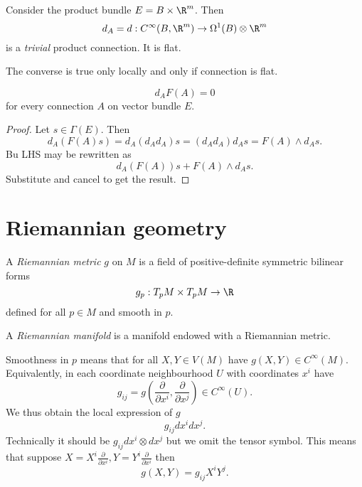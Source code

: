 \documentclass[a4paper]{article}
\newcommand{\w}{\wedge}
\begin{document}
\begin{eg}
  Consider the product bundle \(E = B \times \R^m\). Then
  \[
    d_A = d: C^\infty(B, \R^m) \to \Omega^1(B) \otimes \R^m
  \]
  is a \emph{trivial} product connection. It is flat.

  The converse is true only locally and only if connection is flat.
\end{eg}

\begin{theorem}
  \[
    d_AF(A) = 0
  \]
  for every connection \(A\) on vector bundle \(E\).
\end{theorem}

\begin{proof}
  Let \(s \in \Gamma(E)\). Then
  \[
    d_A(F(A)s) = d_A(d_Ad_A)s = (d_Ad_A)d_As = F(A) \w d_As.
  \]
  Bu LHS may be rewritten as
  \[
    d_A(F(A))s + F(A) \w d_As.
  \]
  Substitute and cancel to get the result.
\end{proof}

\section{Riemannian geometry}

\begin{definition}
  A \emph{Riemannian metric} \(g\) on \(M\) is a field of positive-definite symmetric bilinear forms
  \[
    g_p : T_pM \times T_pM \to \R
  \]
  defined for all \(p \in M\) and smooth in \(p\).
\end{definition}

\begin{definition}
  A \emph{Riemannian manifold} is a manifold endowed with a Riemannian metric.
\end{definition}

\begin{remark}
  Smoothness in \(p\) means that for all \(X, Y \in V(M)\) have \(g(X, Y) \in C^\infty(M)\). Equivalently, in each coordinate neighbourhood \(U\) with coordinates \(x^i\) have
  \[
    g_{ij} = g(\frac{\partial  }{\partial x^i}, \frac{\partial  }{\partial x^j}) \in C^\infty(U).
  \]
  We thus obtain the local expression of \(g\)
  \[
    g_{ij} dx^idx^j.
  \]
  Technically it should be \(g_{ij} dx^i \otimes dx^j\) but we omit the tensor symbol. This means that suppose \(X = X^i \frac{\partial  }{\partial x^i}, Y = Y^i \frac{\partial  }{\partial x^i}\) then
  \[
    g(X, Y) = g_{ij} X^iY^j.
  \]
\end{remark}
\end{document}
